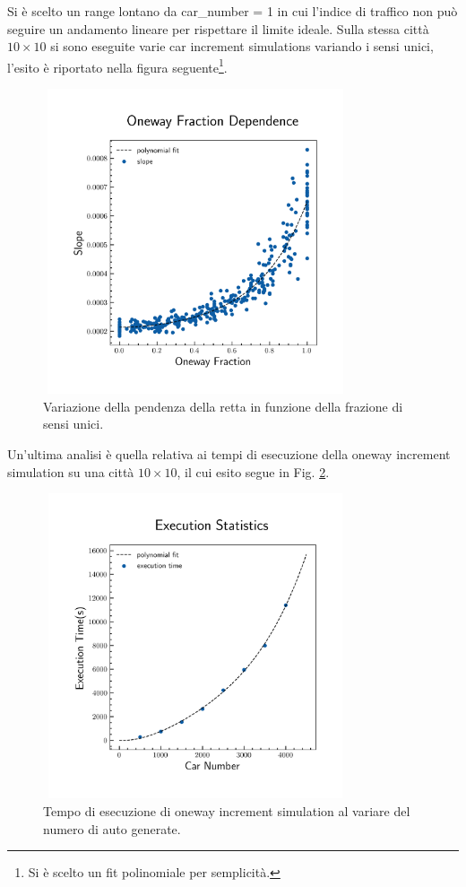 \documentclass[main.tex]{subfiles}
\begin{document}
        Si è scelto un range lontano da car\_number = 1 in cui l'indice di traffico non può seguire un andamento lineare per rispettare il limite ideale.
        Sulla stessa città $10 \times 10$ si sono eseguite varie car increment simulations variando i sensi unici, l'esito è riportato nella figura seguente\footnote{Si è scelto un fit polinomiale per semplicità.}.

        \begin{figure}[H]
            \centering
            \includegraphics[width=9cm, height=9cm]{oneway_fraction_dependence.png}
            \caption{Variazione della pendenza della retta in funzione della frazione di sensi unici.}
            \label{fig:8}
        \end{figure}

        Un'ultima analisi è quella relativa ai tempi di esecuzione della oneway increment simulation su una città $10 \times 10$, il cui esito segue in Fig. \ref{fig:10}.

        \begin{figure}[H]
            \centering
            \includegraphics[width=9cm, height=9cm]{execution_time.png}
            \caption{Tempo di esecuzione di oneway increment simulation al variare del numero di auto generate.}
            \label{fig:10}
        \end{figure}



    
\end{document}
